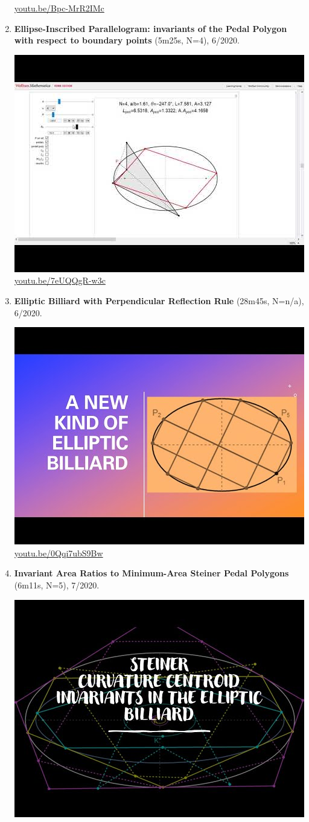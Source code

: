 \documentclass[12pt]{amsart}
\begin{document}
\begin{enumerate}[resume]
\begin{center}
\href{https://youtu.be/Bpc-MrR2IMc}{\url{youtu.be/Bpc-MrR2IMc}}\end{center}
% 
\item \textbf{Ellipse-Inscribed Parallelogram: invariants of the Pedal Polygon with respect to boundary points} (5m25s, N=4), 6/2020. 
\begin{center}\includegraphics[width=.5\textwidth]{pics/7eUQQgR-w3c.jpg} \\ 
\href{https://youtu.be/7eUQQgR-w3c}{\url{youtu.be/7eUQQgR-w3c}}\end{center}
% 
\item \textbf{Elliptic Billiard with Perpendicular Reflection Rule} (28m45s, N=n/a), 6/2020. 
\begin{center}\includegraphics[width=.5\textwidth]{pics/0Qqi7ubS9Bw.jpg} \\ 
\href{https://youtu.be/0Qqi7ubS9Bw}{\url{youtu.be/0Qqi7ubS9Bw}}\end{center}
% 
\item \textbf{Invariant Area Ratios to Minimum-Area Steiner Pedal Polygons} (6m11s, N=5), 7/2020. 
\begin{center}\includegraphics[width=.5\textwidth]{pics/f0JwRlu7iaY.jpg} \\ 

\end{center}
\end{enumerate}
\end{document}
